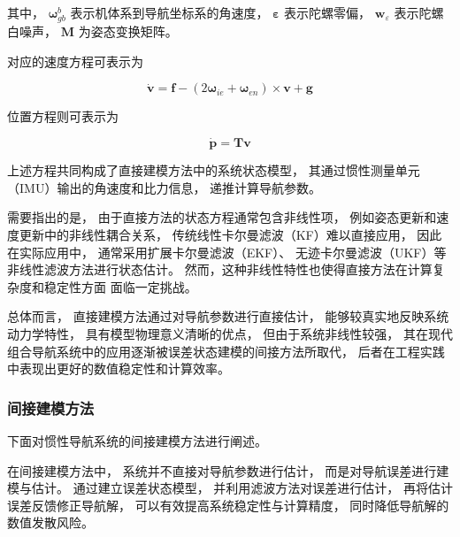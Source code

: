 其中，
$\boldsymbol{\omega}_{gb}^{b}$ 表示机体系到导航坐标系的角速度，
$\boldsymbol{\varepsilon}$ 表示陀螺零偏，
$\boldsymbol{w}_{\varepsilon}$ 表示陀螺白噪声，
$\mathbf{M}$ 为姿态变换矩阵。 \cite{HU2018755}

对应的速度方程可表示为

\begin{equation}
\dot{\boldsymbol{v}}
=
\boldsymbol{f}
-
\left(
2\boldsymbol{\omega}_{ie}
+
\boldsymbol{\omega}_{en}
\right)
\times
\boldsymbol{v}
+
\boldsymbol{g}
\end{equation}

位置方程则可表示为

\begin{equation}
\dot{\boldsymbol{p}}
=
\mathbf{T}
\boldsymbol{v}
\end{equation}

上述方程共同构成了直接建模方法中的系统状态模型，
其通过惯性测量单元（IMU）输出的角速度和比力信息，
递推计算导航参数。




需要指出的是，
由于直接方法的状态方程通常包含非线性项，
例如姿态更新和速度更新中的非线性耦合关系，
传统线性卡尔曼滤波（KF）难以直接应用，
因此在实际应用中，
通常采用扩展卡尔曼滤波（EKF）、
无迹卡尔曼滤波（UKF）等非线性滤波方法进行状态估计。
然而，这种非线性特性也使得直接方法在计算复杂度和稳定性方面
面临一定挑战。 \cite{HU2018755}

总体而言，
直接建模方法通过对导航参数进行直接估计，
能够较真实地反映系统动力学特性，
具有模型物理意义清晰的优点，
但由于系统非线性较强，
其在现代组合导航系统中的应用逐渐被误差状态建模的间接方法所取代，
后者在工程实践中表现出更好的数值稳定性和计算效率。

\subsubsection{间接建模方法}

下面对惯性导航系统的间接建模方法进行阐述。

在间接建模方法中，
系统并不直接对导航参数进行估计，
而是对导航误差进行建模与估计。
通过建立误差状态模型，
并利用滤波方法对误差进行估计，
再将估计误差反馈修正导航解，
可以有效提高系统稳定性与计算精度，
同时降低导航解的数值发散风险。


